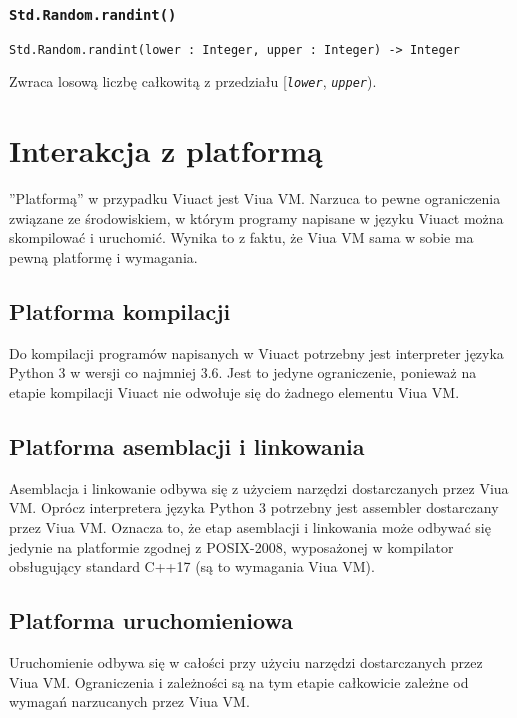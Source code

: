 \subsubsection{\texttt{Std.Random.randint()}}

\begin{small}
\begin{lstlisting}
Std.Random.randint(lower : Integer, upper : Integer) -> Integer
\end{lstlisting}
\end{small}

Zwraca losową liczbę całkowitą z przedziału [\texttt{\emph{lower}}, \texttt{\emph{upper}}).

\section{Interakcja z platformą}

''Platformą'' w przypadku Viuact jest Viua VM. Narzuca to pewne ograniczenia związane ze środowiskiem, w
którym programy napisane w języku Viuact można skompilować i uruchomić. Wynika to z faktu, że Viua VM sama w
sobie ma pewną platformę i wymagania.

\subsection{Platforma kompilacji}

Do kompilacji programów napisanych w Viuact potrzebny jest interpreter języka Python 3 w wersji co najmniej
3.6. Jest to jedyne ograniczenie, ponieważ na etapie kompilacji Viuact nie odwołuje się do żadnego elementu
Viua VM.

\subsection{Platforma asemblacji i linkowania}

Asemblacja i linkowanie odbywa się z użyciem narzędzi dostarczanych przez Viua VM.
Oprócz interpretera języka Python 3 potrzebny jest assembler dostarczany przez Viua VM. Oznacza to, że etap
asemblacji i linkowania może odbywać się jedynie na platformie zgodnej z POSIX-2008, wyposażonej w kompilator
obsługujący standard C++17 (są to wymagania Viua VM).

\subsection{Platforma uruchomieniowa}

Uruchomienie odbywa się w całości przy użyciu narzędzi dostarczanych przez Viua VM.
Ograniczenia i zależności są na tym etapie całkowicie zależne od wymagań narzucanych przez Viua VM.

